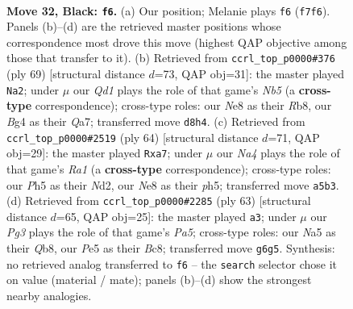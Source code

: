 \documentclass[11pt]{article}
\begin{document}
\clearpage

\begin{figure}[p]\centering
\begin{subfigure}{0.46\textwidth}\centering
\resizebox{\linewidth}{!}{%
\newchessgame
\chessboard[
  setfen={3qn2r/5pk1/p5p1/n1Q1p2p/P3P1b1/N1PP3N/B4PPP/R3K3 b - - 4 32},
  showmover=false,
  pgfstyle=straightmove, color=movearrow, markmove={f7-f6}
]}
\caption{}
\end{subfigure}\hfill
\begin{subfigure}{0.46\textwidth}\centering
\resizebox{\linewidth}{!}{%
\newchessgame
\chessboard[
  setfen={1r5k/q4bp1/2pbp2p/p1N2p2/Pn1P3P/4P1PB/3NQP2/2R3K1 b - - 1 35},
  showmover=false,
  pgfstyle=straightmove, color=movearrow, markmove={b4-a2}
]}
\caption{}
\end{subfigure}
\\[4pt]
\begin{subfigure}{0.46\textwidth}\centering
\resizebox{\linewidth}{!}{%
\newchessgame
\chessboard[
  setfen={1r1q2k1/r4pb1/6p1/1ppPp2p/3nP3/3PB2P/3N1PPK/R1Q5 w - - 0 33},
  showmover=false,
  pgfstyle=straightmove, color=movearrow, markmove={a1-a7}
]}
\caption{}
\end{subfigure}\hfill
\begin{subfigure}{0.46\textwidth}\centering
\resizebox{\linewidth}{!}{%
\newchessgame
\chessboard[
  setfen={1qbb1rk1/5ppp/6n1/1P1N3Q/p3P1P1/4BN1P/PPK5/7R b - - 2 32},
  showmover=false,
  pgfstyle=straightmove, color=movearrow, markmove={a4-a3}
]}
\caption{}
\end{subfigure}
\caption{\textbf{Move 32, Black: \texttt{f6}.} (a) Our position; Melanie plays \texttt{f6} (\texttt{f7f6}). Panels (b)--(d) are the retrieved master positions whose correspondence most drove this move (highest QAP objective among those that transfer to it). (b) Retrieved from \texttt{ccrl\_top\_p0000\#376} (ply 69) [structural distance $d$=73, QAP obj=31]: the master played \texttt{Na2}; under $\mu$ our \emph{Qd1} plays the role of that game's \emph{Nb5} (a \textbf{cross-type} correspondence); cross-type roles: our \emph{N}e8 as their \emph{R}b8, our \emph{B}g4 as their \emph{Q}a7; transferred move \texttt{d8h4}. (c) Retrieved from \texttt{ccrl\_top\_p0000\#2519} (ply 64) [structural distance $d$=71, QAP obj=29]: the master played \texttt{Rxa7}; under $\mu$ our \emph{Na4} plays the role of that game's \emph{Ra1} (a \textbf{cross-type} correspondence); cross-type roles: our \emph{P}h5 as their \emph{N}d2, our \emph{N}e8 as their \emph{p}h5; transferred move \texttt{a5b3}. (d) Retrieved from \texttt{ccrl\_top\_p0000\#2285} (ply 63) [structural distance $d$=65, QAP obj=25]: the master played \texttt{a3}; under $\mu$ our \emph{Pg3} plays the role of that game's \emph{Pa5}; cross-type roles: our \emph{N}a5 as their \emph{Q}b8, our \emph{P}e5 as their \emph{B}c8; transferred move \texttt{g6g5}. Synthesis: no retrieved analog transferred to \texttt{f6} -- the \texttt{search} selector chose it on value (material / mate); panels (b)--(d) show the strongest nearby analogies.}
\label{fig:thought-m63}
\end{figure}
\end{document}
